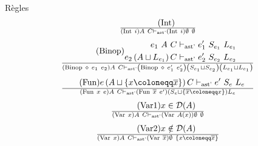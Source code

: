 \documentclass{beamer}
\begin{document}
\begin{frame}{Règles}
    \begin{gather}
        \tag{Int}
        \over \left( \text{Int} ~ i \right) A ~ C \vdash_{\text{ast'}} \left( \text{Int} ~ i \right) \emptyset ~ \emptyset
     \end{gather}
     \begin{gather}
        \tag{Binop}
        \begin{split}
           e_1 ~ A ~ C &\vdash_{\text{ast'}} e_1' ~ S_{e_1} ~ L_{e_1} \\
           e_2 \left( A \sqcup L_{e_1} \right) C &\vdash_{\text{ast'}} e_2' ~ S_{e_2} ~ L_{e_2}
        \end{split}
        \over \left( \text{Binop} ~ \diamond ~ e_1 ~ e_2 \right) A ~ C \vdash_{\text{ast'}} \left( \text{Binop} ~ \diamond ~ e_1' ~ e_2' \right) \left( S_{e_1} \sqcup S_{e_2} \right) \left( L_{e_1} \sqcup L_{e_1} \right)
     \end{gather}
     \begin{gather}
        \tag{Fun}
        \begin{split}
           e \left( A \sqcup \lbrace x \coloneqq \overline{x} \rbrace \right) C &\vdash_{\text{ast'}} e' ~ S_{e} ~ L_{e}
        \end{split}
        \over \left( \text{Fun} ~ x ~ e \right) A ~ C \vdash_{\text{ast'}} \left( \text{Fun} ~ \overline{x} ~ e' \right) \left( S_{e} \sqcup \lbrace \overline{x} \coloneqq x \rbrace \right) L_{e}
     \end{gather}
     \begin{gather}
        \tag{Var1}
        \begin{split}
           x \in \mathcal{D}(A)
        \end{split}
        \over \left( \text{Var} ~ x \right) A ~ C \vdash_{\text{ast'}} \left( \text{Var} ~ A\left( x \right) \right) \emptyset ~ \emptyset
     \end{gather}
     \begin{gather}
        \tag{Var2}
        \begin{split}
           x \notin \mathcal{D}(A)
        \end{split}
        \over \left( \text{Var} ~ x \right) A ~ C \vdash_{\text{ast'}} \left( \text{Var} ~ \overline{x} \right) \emptyset ~ \lbrace x \coloneqq \overline{x} \rbrace
     \end{gather}
     \begin{gather}
        \tag{Let}
        \begin{split}

\end{split}
\end{gather}
\end{frame}
\end{document}
